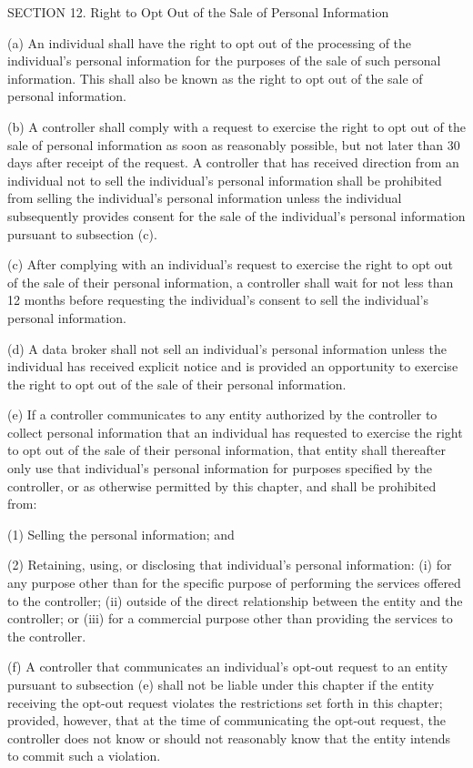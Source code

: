 SECTION 12. Right to Opt Out of the Sale of Personal Information 

(a) An individual shall have the right to opt out of the processing of the individual’s personal information for the purposes of the sale of such personal information. This shall also be known as the right to opt out of the sale of personal information. 

(b) A controller shall comply with a request to exercise the right to opt out of the sale of personal information as soon as reasonably possible, but not later than 30 days after receipt of the request. A controller that has received direction from an individual not to sell the individual’s personal information shall be prohibited from selling the individual’s personal information unless the individual subsequently provides consent for the sale of the individual’s personal information pursuant to subsection (c).

(c) After complying with an individual’s request to exercise the right to opt out of the sale of their personal information, a controller shall wait for not less than 12 months before requesting the individual’s consent to sell the individual’s personal information.

(d) A data broker shall not sell an individual’s personal information unless the individual has received explicit notice and is provided an opportunity to exercise the right to opt out of the sale of their personal information.

(e) If a controller communicates to any entity authorized by the controller to collect personal information that an individual has requested to exercise the right to opt out of the sale of their personal information, that entity shall thereafter only use that individual’s personal information for purposes specified by the controller, or as otherwise permitted by this chapter, and shall be prohibited from:

(1) Selling the personal information; and

(2) Retaining, using, or disclosing that individual’s personal information: (i) for any purpose other than for the specific purpose of performing the services offered to the controller; (ii) outside of the direct relationship between the entity and the controller; or (iii) for a commercial purpose other than providing the services to the controller.

(f) A controller that communicates an individual’s opt-out request to an entity pursuant to subsection (e) shall not be liable under this chapter if the entity receiving the opt-out request violates the restrictions set forth in this chapter; provided, however, that at the time of communicating the opt-out request, the controller does not know or should not reasonably know that the entity intends to commit such a violation.

